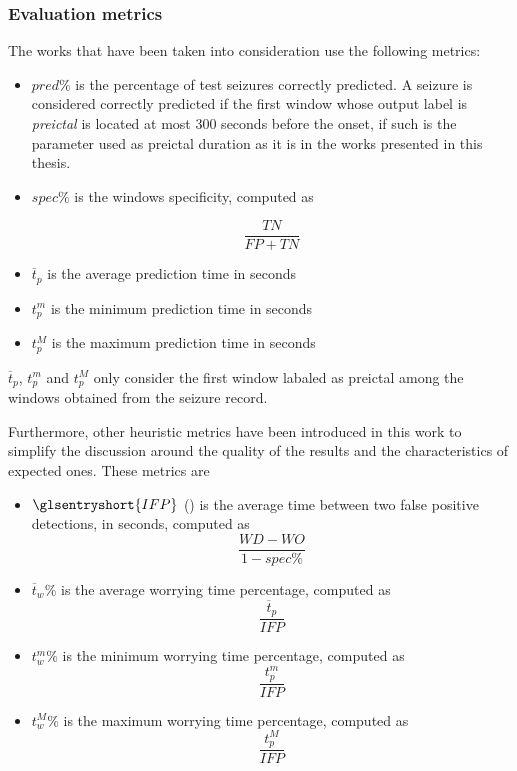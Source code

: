 \subsubsection{Evaluation metrics} \label{subsub:evaluation-metrics}

The works that have been taken into consideration use the following metrics:

\begin{itemize}
    \item $pred\%$ is the percentage of test seizures correctly predicted. A seizure is considered correctly predicted if the first window whose output label is \textit{preictal} is located at most 300 seconds before the onset, if such is the parameter used as preictal duration as it is in the works presented in this thesis.
    \item $spec\%$ is the windows specificity, computed as
    
        \begin{equation}
            \frac{TN}{FP+TN}
        \end{equation}
        
    \item $\overline{t}_p$ is the average prediction time in seconds
    \item $t_p^m$ is the minimum prediction time in seconds
    \item $t_p^M$ is the maximum prediction time in seconds
\end{itemize}

$\overline{t}_p$, $t_p^m$ and $t_p^M$ only consider the first window labaled as preictal among the windows obtained from the seizure record.

Furthermore, other heuristic metrics have been introduced in this work to simplify the discussion around the quality of the results and the characteristics of expected ones. These metrics are

\begin{itemize}
    \item $\glsentryshort{IFP}$ () is the average time between two false positive detections, in seconds, computed as
        \begin{equation}
            \frac{WD - WO}{1 - spec\%}
        \end{equation}
    \item $\overline{t}_w\%$ is the average worrying time percentage, computed as
        \begin{equation}
            \frac{\overline{t}_p}{IFP}
        \end{equation}    
    \item $t_w^m\%$ is the minimum worrying time percentage, computed as
        \begin{equation}
            \frac{t_p^m}{IFP}
        \end{equation}
    \item $t_w^M\%$ is the maximum worrying time percentage, computed as
        \begin{equation}
            \frac{t_p^M}{IFP}
        \end{equation}
\end{itemize}


